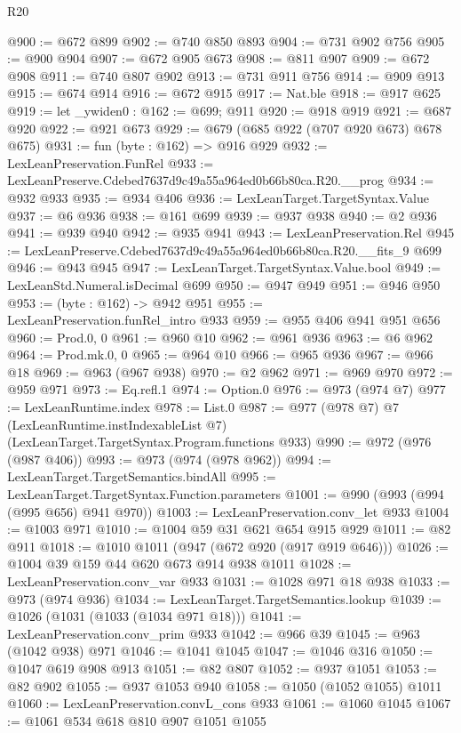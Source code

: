 \begin{lexlean}{R20}
\begin{coremodule}
@900 := @672 @899
@902 := @740 @850 @893
@904 := @731 @902 @756
@905 := @900 @904
@907 := @672 @905 @673
@908 := @811 @907
@909 := @672 @908
@911 := @740 @807 @902
@913 := @731 @911 @756
@914 := @909 @913
@915 := @674 @914
@916 := @672 @915
@917 := Nat.ble
@918 := @917 @625
@919 := let _ywiden0 : @162 := @699; @911
@920 := @918 @919
@921 := @687 @920
@922 := @921 @673
@929 := @679 (@685 @922 (@707 @920 @673) @678 @675)
@931 := fun (byte : @162) => @916 @929
@932 := LexLeanPreservation.FunRel
@933 := LexLeanPreserve.Cdebed7637d9c49a55a964ed0b66b80ca.R20.__prog
@934 := @932 @933
@935 := @934 @406
@936 := LexLeanTarget.TargetSyntax.Value
@937 := @6 @936
@938 := @161 @699
@939 := @937 @938
@940 := @2 @936
@941 := @939 @940
@942 := @935 @941
@943 := LexLeanPreservation.Rel
@945 := LexLeanPreserve.Cdebed7637d9c49a55a964ed0b66b80ca.R20.__fits_9 @699
@946 := @943 @945
@947 := LexLeanTarget.TargetSyntax.Value.bool
@949 := LexLeanStd.Numeral.isDecimal @699
@950 := @947 @949
@951 := @946 @950
@953 := (byte : @162) -> @942 @951
@955 := LexLeanPreservation.funRel_intro @933
@959 := @955 @406 @941 @951 @656
@960 := Prod.{0, 0}
@961 := @960 @10
@962 := @961 @936
@963 := @6 @962
@964 := Prod.mk.{0, 0}
@965 := @964 @10
@966 := @965 @936
@967 := @966 @18
@969 := @963 (@967 @938)
@970 := @2 @962
@971 := @969 @970
@972 := @959 @971
@973 := Eq.refl.{1}
@974 := Option.{0}
@976 := @973 (@974 @7)
@977 := LexLeanRuntime.index
@978 := List.{0}
@987 := @977
    (@978 @7)
    @7
    (LexLeanRuntime.instIndexableList @7)
    (LexLeanTarget.TargetSyntax.Program.functions @933)
@990 := @972 (@976 (@987 @406))
@993 := @973 (@974 (@978 @962))
@994 := LexLeanTarget.TargetSemantics.bindAll
@995 := LexLeanTarget.TargetSyntax.Function.parameters
@1001 := @990 (@993 (@994 (@995 @656) @941 @970))
@1003 := LexLeanPreservation.conv_let @933
@1004 := @1003 @971
@1010 := @1004 @59 @31 @621 @654 @915 @929
@1011 := @82 @911
@1018 := @1010 @1011 (@947 (@672 @920 (@917 @919 @646)))
@1026 := @1004 @39 @159 @44 @620 @673 @914 @938 @1011
@1028 := LexLeanPreservation.conv_var @933
@1031 := @1028 @971 @18 @938
@1033 := @973 (@974 @936)
@1034 := LexLeanTarget.TargetSemantics.lookup
@1039 := @1026 (@1031 (@1033 (@1034 @971 @18)))
@1041 := LexLeanPreservation.conv_prim @933
@1042 := @966 @39
@1045 := @963 (@1042 @938) @971
@1046 := @1041 @1045
@1047 := @1046 @316
@1050 := @1047 @619 @908 @913
@1051 := @82 @807
@1052 := @937 @1051
@1053 := @82 @902
@1055 := @937 @1053 @940
@1058 := @1050 (@1052 @1055) @1011
@1060 := LexLeanPreservation.convL_cons @933
@1061 := @1060 @1045
@1067 := @1061 @534 @618 @810 @907 @1051 @1055

\end{coremodule}
\end{lexlean}
